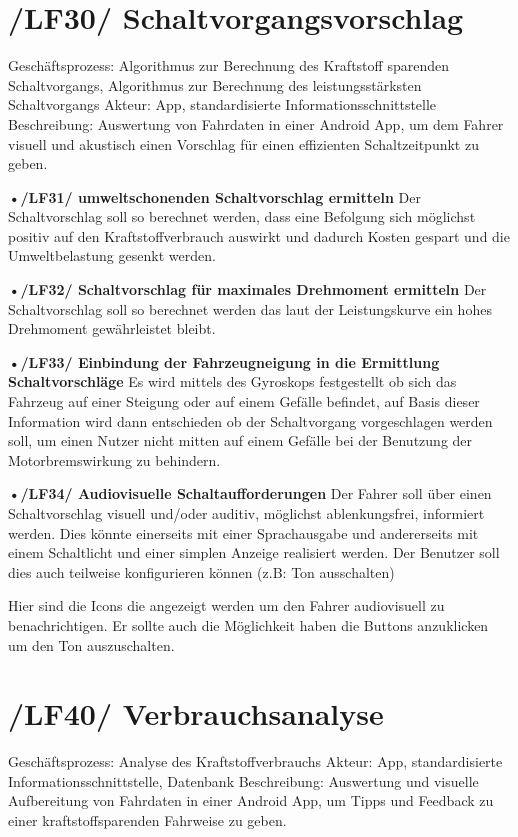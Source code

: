 \section{/LF30/ Schaltvorgangsvorschlag}
Geschäftsprozess:	Algorithmus zur Berechnung des Kraftstoff sparenden Schaltvorgangs, Algorithmus zur Berechnung des leistungsstärksten Schaltvorgangs
Akteur:			App, standardisierte Informationsschnittstelle
Beschreibung:	Auswertung von Fahrdaten in einer Android App, um dem Fahrer visuell und akustisch einen Vorschlag für einen effizienten Schaltzeitpunkt zu geben. 

\textbf{•/LF31/ umweltschonenden Schaltvorschlag ermitteln}
\nextline
Der Schaltvorschlag soll so berechnet werden, dass eine Befolgung sich möglichst positiv auf den Kraftstoffverbrauch auswirkt und dadurch Kosten gespart und die Umweltbelastung gesenkt werden.

\textbf{•/LF32/ Schaltvorschlag für maximales Drehmoment ermitteln}
\nextline
Der Schaltvorschlag soll so berechnet werden das laut der Leistungskurve ein hohes Drehmoment gewährleistet bleibt. 

\textbf{•/LF33/ Einbindung der Fahrzeugneigung in die Ermittlung Schaltvorschläge }
\nextline
Es wird mittels des Gyroskops festgestellt ob sich das Fahrzeug auf einer Steigung oder auf einem Gefälle befindet, auf Basis dieser Information wird dann entschieden ob der Schaltvorgang vorgeschlagen werden soll, um einen Nutzer nicht mitten auf einem Gefälle bei der Benutzung der Motorbremswirkung zu behindern. 

\textbf{•/LF34/ Audiovisuelle Schaltaufforderungen}
\nextline
Der Fahrer soll über einen Schaltvorschlag visuell und/oder auditiv, möglichst ablenkungsfrei, informiert werden. Dies könnte einerseits mit einer Sprachausgabe und andererseits mit einem Schaltlicht und einer simplen Anzeige realisiert werden. Der Benutzer soll dies auch teilweise konfigurieren können (z.B: Ton ausschalten)

Hier sind die Icons die angezeigt werden um den Fahrer audiovisuell zu benachrichtigen.                                                                    Er sollte auch die Möglichkeit haben die Buttons anzuklicken um den Ton auszuschalten. 

\newpage
\section{/LF40/ Verbrauchsanalyse}
Geschäftsprozess:	Analyse des Kraftstoffverbrauchs
Akteur:			App, standardisierte Informationsschnittstelle, Datenbank
Beschreibung:	Auswertung und visuelle Aufbereitung von Fahrdaten in einer Android App, um Tipps und Feedback zu einer kraftstoffsparenden Fahrweise zu geben.

